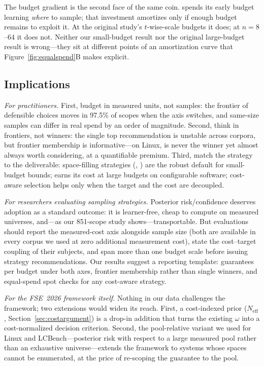 The \srs{} budget gradient is the second face of the same coin. \srs{}
spends its early budget learning \emph{where} to sample; that investment
amortizes only if enough budget remains to exploit it. At the original
study's $t$-wise-scale budgets it does; at $n{=}8$--$64$ it does not.
Neither our small-budget result nor the original large-budget result is
wrong---they sit at different points of an amortization curve that
Figure~\ref{fig:equalspend}B makes explicit.

\subsection{Implications}

\emph{For practitioners.} First, budget in measured units, not samples:
the frontier of defensible choices moves in 97.5\% of scopes when the
axis switches, and same-size samples can differ in real spend by an order
of magnitude. Second, think in frontiers, not winners: the single top
recommendation is unstable across corpora, but frontier membership is
informative---on Linux, \srs{} is never the winner yet almost always
worth considering, at a quantifiable premium. Third, match the strategy
to the deliverable: space-filling strategies (\diShe, \pairwise) are the
robust default for small-budget bounds; \srs{} earns its cost at large
budgets on configurable software; cost-aware selection helps only when
the target and the cost are decoupled.

\emph{For researchers evaluating sampling strategies.} Posterior
risk/confidence deserves adoption as a standard outcome: it is
learner-free, cheap to compute on measured universes, and---as our
851-scope study shows---transportable. But evaluations should report the
measured-cost axis alongside sample size (both are available in every
corpus we used at zero additional measurement cost), state the
cost--target coupling of their subjects, and span more than one budget
scale before issuing strategy recommendations. Our results suggest a
reporting template: guarantees per budget under both axes, frontier
membership rather than single winners, and equal-spend spot checks for
any cost-aware strategy.

\emph{For the FSE~2026 framework itself.} Nothing in our data challenges
the framework; two extensions would widen its reach. First, a
cost-indexed prior ($N_{\mathrm{eff}}$, Section~\ref{sec:costargument})
is a drop-in addition that turns the existing $\omega$ into a
cost-normalized decision criterion. Second, the pool-relative variant we
used for Linux and LCBench---posterior risk with respect to a large
measured pool rather than an exhaustive universe---extends the framework
to systems whose spaces cannot be enumerated, at the price of re-scoping
the guarantee to the pool.

